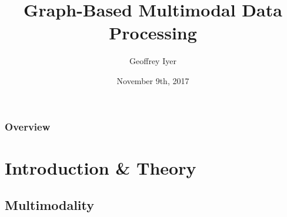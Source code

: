 \documentclass{beamer}
\title[Graph-Based Multimodal Data Processing]{Graph-Based Multimodal Data Processing} %
\author{Geoffrey Iyer} %
\institute[UCLA] %
{
  University of California, Los Angeles \\ %
  \medskip
  \textit{gsiyer@math.ucla.edu} %
}
\date{November 9th, 2017} %
\begin{document}
\begin{frame}
  \titlepage %
\end{frame}

\begin{frame}
  \frametitle{Overview} %
  \tableofcontents %
\end{frame}




\section{Introduction \& Theory} %

\subsection{Multimodality} %
\end{document}
